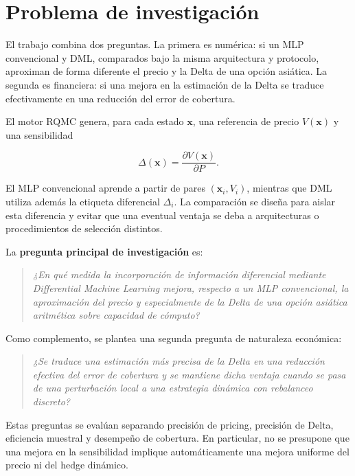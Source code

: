 \section{Problema de investigación}
\label{sec:problema_investigacion}

El trabajo combina dos preguntas. La primera es numérica: si un MLP convencional y
DML, comparados bajo la misma arquitectura y protocolo, aproximan de forma diferente
el precio y la Delta de una opción asiática. La segunda es financiera: si una mejora
en la estimación de la Delta se traduce efectivamente en una reducción del error de
cobertura.

El motor RQMC genera, para cada estado $\mathbf{x}$, una referencia de precio
$V(\mathbf{x})$ y una sensibilidad

\begin{equation}
    \Delta(\mathbf{x})
    =
    \frac{\partial V(\mathbf{x})}{\partial P}.
\end{equation}

El MLP convencional aprende a partir de pares $(\mathbf{x}_i,V_i)$, mientras que
DML utiliza además la etiqueta diferencial $\Delta_i$. La comparación se diseña
para aislar esta diferencia y evitar que una eventual ventaja se deba a arquitecturas
o procedimientos de selección distintos.

La \textbf{pregunta principal de investigación} es:

\begin{quote}
\emph{¿En qué medida la incorporación de información diferencial mediante
Differential Machine Learning mejora, respecto a un MLP convencional, la
aproximación del precio y especialmente de la Delta de una opción asiática
aritmética sobre capacidad de cómputo?}
\end{quote}

Como complemento, se plantea una segunda pregunta de naturaleza económica:

\begin{quote}
\emph{¿Se traduce una estimación más precisa de la Delta en una reducción efectiva
del error de cobertura y se mantiene dicha ventaja cuando se pasa de una
perturbación local a una estrategia dinámica con rebalanceo discreto?}
\end{quote}

Estas preguntas se evalúan separando precisión de pricing, precisión de Delta,
eficiencia muestral y desempeño de cobertura. En particular, no se presupone que
una mejora en la sensibilidad implique automáticamente una mejora uniforme del
precio ni del hedge dinámico.

